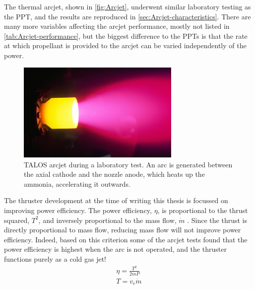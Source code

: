 The thermal arcjet, shown in \autoref{fig:Arcjet}, underwent similar laboratory testing as the PPT, and the results are reproduced in \autoref{sec:Arcjet-characteristics}. There are many more variables affecting the arcjet performance, mostly not listed in \autoref{tab:Arcjet-performance}, but the biggest difference to the PPTs is that the rate at which propellant is provided to the arcjet can be varied independently of the power. 

\begin{figure}
\centering
\includegraphics[width=0.7\textwidth]{Images/hiparc_betrieb.png}
\caption{TALOS arcjet during a laboratory test. An arc is generated between the axial cathode and the nozzle anode, which heats up the ammonia, accelerating it outwards.} \label{fig:Arcjet}
\end{figure}

The thruster development at the time of writing this thesis is focussed on improving power efficiency. The power efficiency, $\eta$, is proportional to the thrust squared, $T^2$, and inversely proportional to the mass flow, $\dot{m}$ \parencite{Wollenhaupt2011}. Since the thrust is directly proportional to mass flow, reducing mass flow will not improve power efficiency. Indeed, based on this criterion some of the arcjet tests found that the power efficiency is highest when the arc is not operated, and the thruster functions purely as a cold gas jet! 
\begin{subequations}
\begin{gather}
\eta = \frac{T^2}{2\dot{m}P} \label{eq:thruster-efficiency}\\
T = v_e\dot{m} \label{eq:thrust} 
\end{gather}
\end{subequations}

